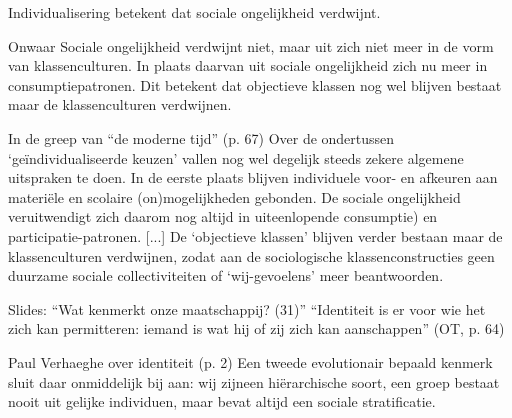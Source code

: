 \documentclass[main.tex]{subfiles}
\begin{document}
\begin{examenvraag}
    \begin{stelling}
        Individualisering betekent dat sociale ongelijkheid verdwijnt.
    \end{stelling}

    \begin{stelling-antwoord}{Onwaar}
        Sociale ongelijkheid verdwijnt niet, maar uit zich niet meer in de 
        vorm van klassenculturen.
        In plaats daarvan uit sociale ongelijkheid zich nu meer in 
        consumptiepatronen.
        Dit betekent dat objectieve klassen nog wel blijven bestaat maar de 
        klassenculturen verdwijnen.
        \begin{citaat}{In de greep van ``de moderne tijd'' (p. 67)}
            Over de ondertussen `ge\"individualiseerde keuzen' vallen nog wel degelijk steeds zekere algemene uitspraken te doen.
            In de eerste plaats blijven individuele voor- en afkeuren aan materi\"ele en scolaire (on)mogelijkheden gebonden.
            De sociale ongelijkheid veruitwendigt zich daarom nog altijd in uiteenlopende consumptie) en participatie-patronen.
            [...]
            De `objectieve klassen' blijven verder bestaan maar de klassenculturen 
            verdwijnen, zodat aan de sociologische klassenconstructies geen duurzame sociale collectiviteiten of `wij-gevoelens' meer beantwoorden.
        \end{citaat}
        \begin{citaat}{Slides: ``Wat kenmerkt onze maatschappij? (31)''}
            ``Identiteit is er voor wie het zich kan permitteren: iemand is wat hij of zij zich kan aanschappen'' (OT, p. 64)
        \end{citaat}
        \begin{citaat}{Paul Verhaeghe over identiteit (p. 2)}
            Een tweede evolutionair bepaald kenmerk sluit daar onmiddelijk bij aan: wij zijneen hi\"erarchische soort, een groep bestaat nooit uit gelijke individuen, maar bevat altijd een sociale stratificatie.
        \end{citaat}
    \end{stelling-antwoord}
\end{examenvraag}
\end{document}
